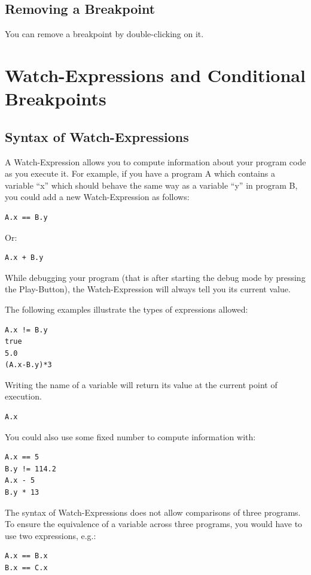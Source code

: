 \documentclass[parskip=full]{memoir}
\begin{document}
\section{Removing a Breakpoint}
You can remove a breakpoint by double-clicking on it.

\chapter{Watch-Expressions and Conditional Breakpoints}
\section{Syntax of Watch-Expressions}
A Watch-Expression allows you to compute information about your program code as you execute it.
For example, if you have a program A which contains a variable \enquote{x} which should behave the same way as a variable \enquote{y} in program B, you could add a new Watch-Expression as follows:
\begin{verbatim}
A.x == B.y
\end{verbatim}
Or:
\begin{verbatim}
A.x + B.y
\end{verbatim}

While debugging your program (that is after starting the debug mode by pressing the Play-Button), the Watch-Expression will always tell you its current value.

The following examples illustrate the types of expressions allowed:
\begin{verbatim}
A.x != B.y
true
5.0
(A.x-B.y)*3
\end{verbatim}

Writing the name of a variable will return its value at the current point of execution.
\begin{verbatim}
A.x
\end{verbatim}

You could also use some fixed number to compute information with:
\begin{verbatim}
A.x == 5
B.y != 114.2
A.x - 5
B.y * 13
\end{verbatim}

The syntax of Watch-Expressions does not allow comparisons of three programs. To ensure the equivalence of a variable across three programs, you would have to use two expressions, e.g.:
\begin{verbatim}
A.x == B.x
B.x == C.x
\end{verbatim}
\end{document}
